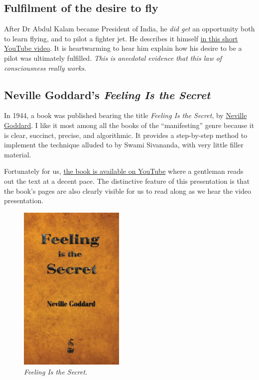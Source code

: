 \documentclass[
  a4paper,
]{article}
\begin{document}
\hypertarget{fulfilment-of-the-desire-to-fly}{%
\subsection{Fulfilment of the desire to
fly}\label{fulfilment-of-the-desire-to-fly}}

After Dr Abdul Kalam became President of India, he \emph{did get} an
opportunity both to learn flying, and to pilot a fighter jet. He
describes it himself
\href{https://www.youtube.com/shorts/kWnxd3af4rM}{in this short YouTube
video}. It is heartwarming to hear him explain how his desire to be a
pilot was ultimately fulfilled. \emph{This is anecdotal evidence that
this law of consciousness really works.}

\hypertarget{neville-goddards-feeling-is-the-secret}{%
\subsection{\texorpdfstring{Neville Goddard's \emph{Feeling Is the
Secret}}{Neville Goddard's Feeling Is the Secret}}\label{neville-goddards-feeling-is-the-secret}}

In 1944, a book was published bearing the title \emph{Feeling Is the
Secret}, by \href{feeling\%20is\%20the\%20secret}{Neville Goddard}. I
like it most among all the books of the ``manifesting'' genre because it
is clear, succinct, precise, and algorithmic. It provides a step-by-step
method to implement the technique alluded to by Swami Sivananda, with
very little filler material.

Fortunately for us,
\href{https://www.youtube.com/watch?v=ffNWoefuwPM}{the book is available
on YouTube} where a gentleman reads out the text at a decent pace. The
distinctive feature of this presentation is that the book's pages are
also clearly visible for us to read along as we hear the video
presentation.

\begin{figure}
\centering
\includegraphics[width=0.45\textwidth,height=\textheight]{images/Feeling-is-the-Secret.jpg}
\caption{\emph{Feeling Is the Secret}.}
\end{figure}
\end{document}
